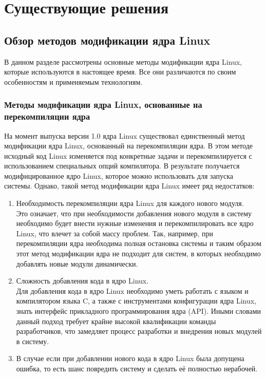 \section{Существующие решения}\label{ch:--}
\subsection{Обзор методов модификации ядра Linux}\label{sec:----linux}

В данном разделе рассмотрены основные методы модификации ядра Linux, которые используются в настоящее время.
Все они различаются по своим особенностям и применяемым технологиям.

\subsubsection{Методы модификации ядра Linux, основанные на перекомпиляции ядра}\label{subsec:---linux----}

На момент выпуска версии 1.0 ядра Linux существовал единственный метод модификации ядра Linux, основанный на перекомпиляции ядра.
В этом методе исходный код Linux изменяется под конкретные задачи и перекомпилируется с использованием специальных опций компилятора.
В результате получается модифицированное ядро Linux, которое можно использовать для запуска системы.
Однако, такой метод модификации ядра Linux имеет ряд недостатков:
\begin{enumerate}
    \item Необходимость перекомпиляции ядра Linux для каждого нового модуля. \vspace{1mm}\\
    Это означает, что при необходимости добавления нового модуля в систему необходимо будет внести нужные изменения и перекомпилировать все ядро Linux, что влечет за собой массу проблем.
    Так, например, при перекомпиляции ядра необходима полная остановка системы и таким образом этот метод модификации ядра не подходит для систем, в которых необходимо добавлять новые модули динамически.

    \item Сложность добавления кода в ядро Linux. \vspace{1mm}\\
    Для добавления кода в ядро Linux необходимо уметь работать с языком и компилятором языка C, а также с инструментами конфигурации ядра Linux, знать интерфейс прикладного программирования ядра (API)\cite{API-linux}.
    Иными словами данный подход требует крайне высокой квалификации команды разработчиков, что замедляет процесс разработки и внедрения новых модулей в систему.
    \item В случае если при добавлении нового кода в ядро Linux была допущена ошибка, то есть шанс повредить систему и сделать её полностью нерабочей.
\end{enumerate}

